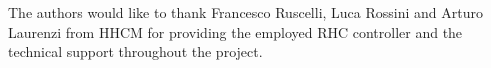 \begin{Large}
	\vskip1cm
	The authors would like to thank Francesco Ruscelli, Luca Rossini and Arturo Laurenzi from HHCM for providing the employed RHC controller and the technical support throughout the project.\\
	\vskip1cm
\end{Large}